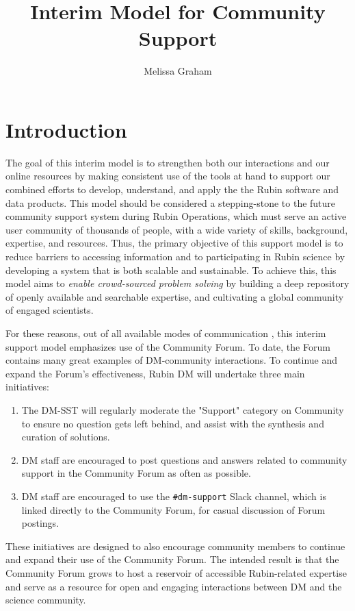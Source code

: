 \documentclass[DM,lsstdraft,authoryear,toc]{lsstdoc}
\title{Interim Model for Community Support}
\author{%
Melissa Graham
}
\date{\vcsDate}
\begin{document}
\maketitle

\section{Introduction} \label{sec:intro}

The goal of this interim model is to strengthen both our interactions and our online resources by making consistent use of the tools at hand to support our combined efforts to develop, understand, and apply the the Rubin software and data products. 
This model should be considered a stepping-stone to the future community support system during Rubin Operations, which must serve an active user community of thousands of people, with a wide variety of skills, background, expertise, and resources.
Thus, the primary objective of this support model is to reduce barriers to accessing information and to participating in Rubin science by developing a system that is both scalable and sustainable.
To achieve this, this model aims to {\it enable crowd-sourced problem solving} by building a deep repository of openly available and searchable expertise, and cultivating a global community of engaged scientists.

For these reasons, out of all available modes of communication , this interim support model emphasizes use of the Community Forum. To date, the Forum contains many great examples of DM-community interactions. To continue and expand the Forum's effectiveness, Rubin DM will undertake three main initiatives: 
\begin{enumerate}
\item The DM-SST will regularly moderate the "Support" category on Community to ensure no question gets left behind, and assist with the synthesis and curation of solutions.
\item DM staff are encouraged to post questions and answers related to community support in the Community Forum as often as possible.
\item DM staff are encouraged to use the {\tt \#dm-support} Slack channel, which is linked directly to the Community Forum, for casual discussion of Forum postings. 
\end{enumerate}
These initiatives are designed to also encourage community members to continue and expand their use of the Community Forum.
The intended result is that the Community Forum grows to host a reservoir of accessible Rubin-related expertise and serve as a resource for open and engaging interactions between DM and the science community. 
\end{document}
